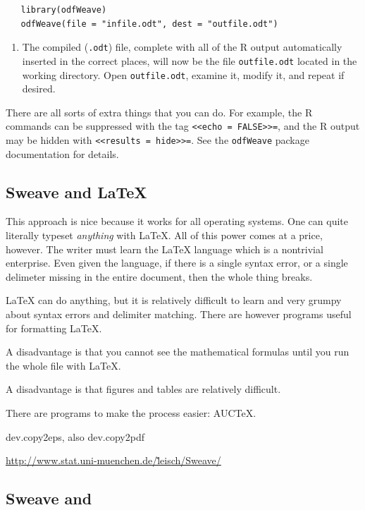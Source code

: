 \documentclass[captions=tableheading]{scrbook}
\begin{document}
\begin{verbatim}
   library(odfWeave)
   odfWeave(file = "infile.odt", dest = "outfile.odt")
\end{verbatim}
\begin{enumerate}
\item The compiled (\texttt{.odt}) file, complete with all of the \textsf{R} output automatically inserted in the correct places, will now be the file \texttt{outfile.odt} located in the working directory. Open \texttt{outfile.odt}, examine it, modify it, and repeat if desired.
\end{enumerate}

There are all sorts of extra things that you can do. For example, the \textsf{R} commands can be suppressed with the tag \texttt{<\textcompwordmark{}<echo = FALSE>\textcompwordmark{}>=}, and the \textsf{R} output may be hidden with \texttt{<\textcompwordmark{}<results = hide>\textcompwordmark{}>=}. See the \texttt{odfWeave} package documentation for details.
\subsection{Sweave and \protect\LaTeX{}}
\label{sec-22-2-3}


This approach is nice because it works for all operating systems. One can quite literally typeset \emph{anything} with \LaTeX{}. All of this power comes at a price, however. The writer must learn the \LaTeX{} language which is a nontrivial enterprise. Even given the language, if there is a single syntax error, or a single delimeter missing in the entire document, then the whole thing breaks.

\LaTeX{} can do anything, but it is relatively difficult to learn  and very grumpy about syntax errors and delimiter matching. There are however programs useful for formatting \LaTeX{}.

A disadvantage is that you cannot see the mathematical formulas until you run the whole file with \LaTeX{}.

A disadvantage is that figures and tables are relatively difficult.

There are programs to make the process easier: AUC\TeX{}.

dev.copy2eps, also dev.copy2pdf

\href{http://www.stat.uni-muenchen.de/~leisch/Sweave/}{http://www.stat.uni-muenchen.de/\~leisch/Sweave/}
\subsection{Sweave and \protect\LyX{}}
\label{sec-22-2-4}
\end{document}
